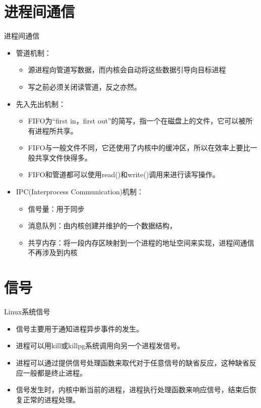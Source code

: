 \section{进程间通信}
\begin{frame}{进程间通信}
     \begin{itemize}
     \item 管道机制：
           \begin{itemize}
           \item 源进程向管道写数据，而内核会自动将这些数据引导向目标进程
           \item 写之前必须关闭读管道，反之亦然。
           \end{itemize}
     \item 先入先出机制：
            \begin{itemize}
            \item FIFO为“first in，first out”的简写，指一个在磁盘上的文件，它可以被所有进程所共享。
            \item FIFO与一般文件不同，它还使用了内核中的缓冲区，所以在效率上要比一般共享文件快得多。
            \item FIFO和管道都可以使用read()和write()调用来进行读写操作。
            \end{itemize}
     \item IPC(Interprocess Communication)机制：
           \begin{itemize}
           \item 信号量：用于同步
           \item 消息队列：由内核创建并维护的一个数据结构，
           \item 共亨内存：将一段内存区映射到一个进程的地址空间来实现，进程间通信不再涉及到内核
           \end{itemize}
     \end{itemize}
\end{frame}

\section{信号}
\begin{frame}{Linux系统信号}
\begin{itemize}
\item 信号主要用于通知进程异步事件的发生。 
\item 进程可以用kill或killpg系统调用向另一个进程发信号。
\item 进程可以通过提供信号处理函数来取代对于任意信号的缺省反应，这种缺省反应一般都是终止进程。
\item 信号发生时，内核中断当前的进程，进程执行处理函数来响应信号，结束后恢复正常的进程处理。
\end{itemize}
\end{frame}

